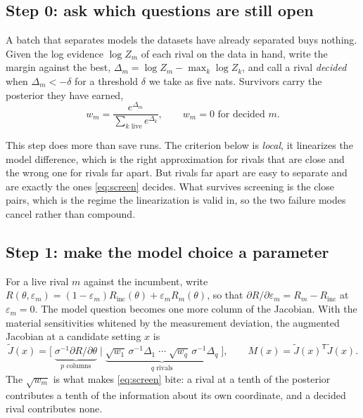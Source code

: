 \documentclass[10pt]{article}
\begin{document}
\subsection*{Step 0: ask which questions are still open}

A batch that separates models the datasets have already separated buys nothing. Given the log
evidence $\log Z_m$ of each rival on the data in hand, write the margin against the best,
$\Delta_m = \log Z_m - \max_k \log Z_k$, and call a rival \emph{decided} when
$\Delta_m < -\delta$ for a threshold $\delta$ we take as five nats. Survivors carry the
posterior they have earned,
%
\begin{equation}
w_m = \frac{e^{\Delta_m}}{\sum_{k \text{ live}} e^{\Delta_k}} ,
\qquad w_m = 0 \text{ for decided } m .
\label{eq:screen}
\end{equation}

This step does more than save runs. The criterion below is \emph{local}, it linearizes the
model difference, which is the right approximation for rivals that are close and the wrong
one for rivals far apart. But rivals far apart are easy to separate and are exactly the ones
\eqref{eq:screen} decides. What survives screening is the close pairs, which is the regime the
linearization is valid in, so the two failure modes cancel rather than compound.

\subsection*{Step 1: make the model choice a parameter}

For a live rival $m$ against the incumbent, write
$R(\theta,\varepsilon_m) = (1-\varepsilon_m) R_{\text{inc}}(\theta) + \varepsilon_m R_m(\theta)$,
so that $\partial R/\partial\varepsilon_m = R_m - R_{\text{inc}}$ at $\varepsilon_m = 0$. The
model question becomes one more column of the Jacobian. With the material sensitivities
whitened by the measurement deviation, the augmented Jacobian at a candidate setting $x$ is
%
\begin{equation}
\tilde J(x) = \Big[\; \underbrace{\sigma^{-1}\partial R/\partial\theta}_{p \text{ columns}}
 \;\Big|\; \underbrace{\sqrt{w_1}\,\sigma^{-1}\Delta_1 \;\cdots\; \sqrt{w_q}\,\sigma^{-1}\Delta_q}_{q \text{ rivals}} \;\Big],
\qquad M(x) = \tilde J(x)^{\mathsf T} \tilde J(x) .
\label{eq:augmented}
\end{equation}
%
The $\sqrt{w_m}$ is what makes \eqref{eq:screen} bite: a rival at a tenth of the posterior
contributes a tenth of the information about its own coordinate, and a decided rival
contributes none.
\end{document}
